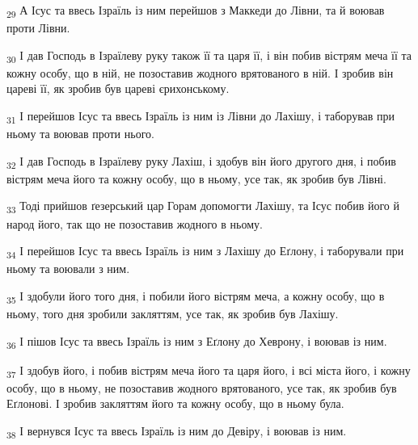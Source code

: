 \begin{tcolorbox}
\textsubscript{29} А Ісус та ввесь Ізраїль із ним перейшов з Маккеди до Лівни, та й воював проти Лівни.
\end{tcolorbox}
\begin{tcolorbox}
\textsubscript{30} І дав Господь в Ізраїлеву руку також її та царя її, і він побив вістрям меча її та кожну особу, що в ній, не позоставив жодного врятованого в ній. І зробив він цареві її, як зробив був цареві єрихонському.
\end{tcolorbox}
\begin{tcolorbox}
\textsubscript{31} І перейшов Ісус та ввесь Ізраїль із ним із Лівни до Лахішу, і таборував при ньому та воював проти нього.
\end{tcolorbox}
\begin{tcolorbox}
\textsubscript{32} І дав Господь в Ізраїлеву руку Лахіш, і здобув він його другого дня, і побив вістрям меча його та кожну особу, що в ньому, усе так, як зробив був Лівні.
\end{tcolorbox}
\begin{tcolorbox}
\textsubscript{33} Тоді прийшов ґезерський цар Горам допомогти Лахішу, та Ісус побив його й народ його, так що не позоставив жодного в ньому.
\end{tcolorbox}
\begin{tcolorbox}
\textsubscript{34} І перейшов Ісус та ввесь Ізраїль із ним з Лахішу до Еґлону, і таборували при ньому та воювали з ним.
\end{tcolorbox}
\begin{tcolorbox}
\textsubscript{35} І здобули його того дня, і побили його вістрям меча, а кожну особу, що в ньому, того дня зробили закляттям, усе так, як зробив був Лахішу.
\end{tcolorbox}
\begin{tcolorbox}
\textsubscript{36} І пішов Ісус та ввесь Ізраїль із ним з Еґлону до Хеврону, і воював із ним.
\end{tcolorbox}
\begin{tcolorbox}
\textsubscript{37} І здобув його, і побив вістрям меча його та царя його, і всі міста його, і кожну особу, що в ньому, не позоставив жодного врятованого, усе так, як зробив був Еґлонові. І зробив закляттям його та кожну особу, що в ньому була.
\end{tcolorbox}
\begin{tcolorbox}
\textsubscript{38} І вернувся Ісус та ввесь Ізраїль із ним до Девіру, і воював із ним.
\end{tcolorbox}
